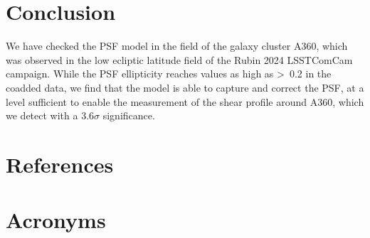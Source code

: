 \documentclass[SE,lsstdraft,authoryear,toc]{lsstdoc}
\begin{document}
\section{Conclusion}
\label{sec:conclusion}
We have checked the PSF model in the field of the galaxy cluster A360, which was observed in the low ecliptic latitude field of the Rubin 2024 LSSTComCam campaign. While the PSF ellipticity reaches values as high as >~0.2 in the coadded data, we find that the model is able to capture and correct the PSF, at a level sufficient to enable the measurement of the shear profile around A360, which we detect with a 3.6$\sigma$ significance.


\appendix
\section{References} \label{sec:bib}
\renewcommand{\refname}{} %


\section{Acronyms} \label{sec:acronyms}

\end{document}
